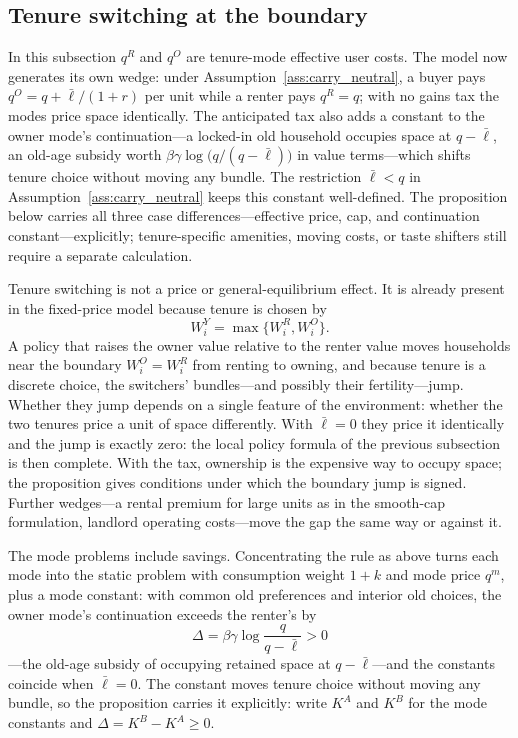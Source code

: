 \documentclass[11pt]{article}
\newcommand{\1}{\mathbf 1}
\begin{document}
\subsection{Tenure switching at the boundary}

In this subsection $q^R$ and $q^O$ are tenure-mode effective user costs. The model now generates its own wedge: under Assumption~\ref{ass:carry_neutral}, a buyer pays $q^O=q+\bar\ell/(1+r)$ per unit while a renter pays $q^R=q$; with no gains tax the modes price space identically. The anticipated tax also adds a constant to the owner mode's continuation---a locked-in old household occupies space at $q-\bar\ell$, an old-age subsidy worth $\beta\gamma\log\big(q/(q-\bar\ell)\big)$ in value terms---which shifts tenure choice without moving any bundle. The restriction $\bar\ell<q$ in Assumption~\ref{ass:carry_neutral} keeps this constant well-defined. The proposition below carries all three case differences---effective price, cap, and continuation constant---explicitly; tenure-specific amenities, moving costs, or taste shifters still require a separate calculation.

Tenure switching is not a price or general-equilibrium effect. It is already present in the fixed-price model because tenure is chosen by
\[
W_i^Y=\max\{W_i^R,W_i^O\}.
\]
A policy that raises the owner value relative to the renter value moves households near the boundary $W_i^O=W_i^R$ from renting to owning, and because tenure is a discrete choice, the switchers' bundles---and possibly their fertility---jump. Whether they jump depends on a single feature of the environment: whether the two tenures price a unit of space differently. With $\bar\ell=0$ they price it identically and the jump is exactly zero: the local policy formula of the previous subsection is then complete. With the tax, ownership is the expensive way to occupy space; the proposition gives conditions under which the boundary jump is signed. Further wedges---a rental premium for large units as in the smooth-cap formulation, landlord operating costs---move the gap the same way or against it.

The mode problems include savings. Concentrating the rule as above turns each mode into the static problem with consumption weight $1+k$ and mode price $q^m$, plus a mode constant: with common old preferences and interior old choices, the owner mode's continuation exceeds the renter's by
\[
\Delta=\beta\gamma\log\frac{q}{q-\bar\ell}>0
\]
---the old-age subsidy of occupying retained space at $q-\bar\ell$---and the constants coincide when $\bar\ell=0$. The constant moves tenure choice without moving any bundle, so the proposition carries it explicitly: write $K^A$ and $K^B$ for the mode constants and $\Delta=K^B-K^A\ge0$.
\end{document}
